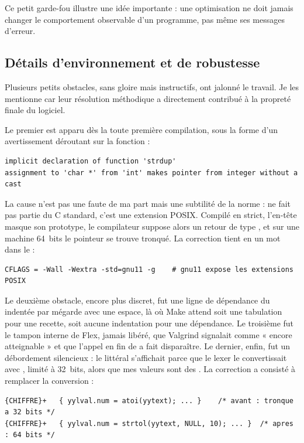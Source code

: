 Ce petit garde-fou illustre une idée importante : une optimisation ne doit jamais
changer le comportement observable d'un programme, pas même ses messages
d'erreur.

\subsection{Détails d'environnement et de robustesse}

Plusieurs petits obstacles, sans gloire mais instructifs, ont jalonné le travail.
Je les mentionne car leur résolution méthodique a directement contribué à la
propreté finale du logiciel.

Le premier est apparu dès la toute première compilation, sous la forme d'un
avertissement déroutant sur la fonction  :

\begin{lstlisting}[style=gram]
implicit declaration of function 'strdup'
assignment to 'char *' from 'int' makes pointer from integer without a cast
\end{lstlisting}

La cause n'est pas une faute de ma part mais une subtilité de la norme :
 ne fait pas partie du C standard, c'est une extension POSIX. Compilé
en  strict, l'en-tête masque son prototype, le compilateur suppose
alors un retour de type , et sur une machine 64~bits le pointeur se
trouve tronqué. La correction tient en un mot dans le  :

\begin{lstlisting}[style=gram]
CFLAGS = -Wall -Wextra -std=gnu11 -g    # gnu11 expose les extensions POSIX
\end{lstlisting}

Le deuxième obstacle, encore plus discret, fut une ligne de dépendance du
 indentée par mégarde avec une espace, là où Make attend soit une
tabulation pour une recette, soit aucune indentation pour une dépendance.
Le troisième fut le tampon interne de Flex, jamais libéré, que Valgrind signalait
comme « encore atteignable » et que l'appel  en fin de
 a fait disparaître. Le dernier, enfin, fut un débordement silencieux :
le littéral  s'affichait  parce que le lexer le
convertissait avec , limité à 32~bits, alors que mes valeurs sont des
. La correction a consisté à remplacer la conversion :

\begin{lstlisting}[style=gram,caption={Avant et après, dans \code{ilang.l}.}]
{CHIFFRE}+   { yylval.num = atoi(yytext); ... }    /* avant : tronque a 32 bits */
{CHIFFRE}+   { yylval.num = strtol(yytext, NULL, 10); ... }  /* apres : 64 bits */
\end{lstlisting}

